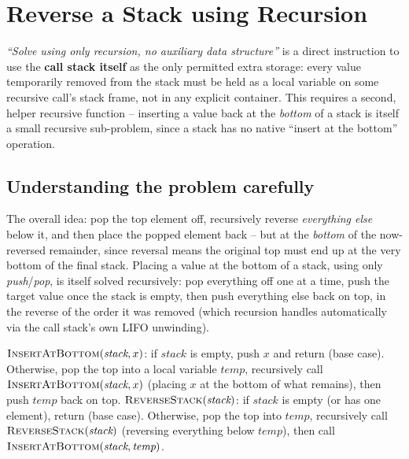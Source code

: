 \section{Reverse a Stack using Recursion}
\label{sec:rec-reverse-stack}


\begin{patternbox}
\emph{``Solve using only recursion, no auxiliary data structure''} is a
direct instruction to use the \textbf{call stack itself} as the only
permitted extra storage: every value temporarily removed from the stack
must be held as a local variable on some recursive call's stack frame,
not in any explicit container. This requires a second, helper recursive
function -- inserting a value back at the \emph{bottom} of a stack is
itself a small recursive sub-problem, since a stack has no native
``insert at the bottom'' operation.
\end{patternbox}

\subsection*{Understanding the problem carefully}

The overall idea: pop the top element off, recursively reverse
\emph{everything else} below it, and then place the popped element back
-- but at the \emph{bottom} of the now-reversed remainder, since
reversal means the original top must end up at the very bottom of the
final stack. Placing a value at the bottom of a stack, using only
\textit{push}/\textit{pop}, is itself solved recursively: pop everything
off one at a time, push the target value once the stack is empty, then
push everything else back on top, in the reverse of the order it was
removed (which recursion handles automatically via the call stack's own
LIFO unwinding).

\begin{ideabox}
$\textsc{InsertAtBottom}(\textit{stack}, x)$: if $\textit{stack}$ is
empty, push $x$ and return (base case). Otherwise, pop the top into a
local variable $\textit{temp}$, recursively call
$\textsc{InsertAtBottom}(\textit{stack}, x)$ (placing $x$ at the bottom
of what remains), then push $\textit{temp}$ back on top.
$\textsc{ReverseStack}(\textit{stack})$: if $\textit{stack}$ is empty (or
has one element), return (base case). Otherwise, pop the top into
$\textit{temp}$, recursively call
$\textsc{ReverseStack}(\textit{stack})$ (reversing everything below
$\textit{temp}$), then call
$\textsc{InsertAtBottom}(\textit{stack}, \textit{temp})$.
\end{ideabox}

